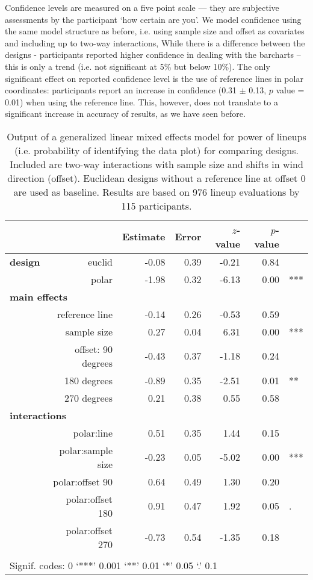  Confidence levels are measured on a five point scale --- they are subjective assessments by the participant `how certain are you'. We model confidence using the same model structure as before, i.e. using sample size and offset as covariates and including up to two-way interactions,
While there is a difference between the designs - participants reported higher confidence in dealing with the barcharts -- this is only  a trend (i.e. not significant at 5\% but below 10\%). The only significant effect on reported confidence level is the use of reference lines in polar coordinates: participants report an increase in confidence (0.31 $\pm$ 0.13, $p$ value = 0.01) when using the reference line. This, however, does not translate to a significant increase in accuracy of results, as we have seen before.

\begin{table}[ht]
\begin{center}
\resizebox{\linewidth}{!} {
\begin{tabular}{rrrrrrl}
  \hline
& & Estimate & Error & $z$-value & $p$-value &\\ 
  \hline
\bf design & euclid & -0.08 & 0.39 & -0.21 & 0.84 &\\ 
&polar & -1.98 & 0.32 & -6.13 & 0.00 & ***\\ [3pt]
\multicolumn{2}{l}{\bf main effects} &&&&&\\
& reference line  & -0.14 & 0.26 & -0.53 & 0.59 & \\ [1pt]
&  sample size & 0.27 & 0.04 & 6.31 & 0.00 & ***\\[1pt]
 &offset:  90 degrees& -0.43 & 0.37 & -1.18 & 0.24 &\\ 
  & 180 degrees& -0.89 & 0.35 & -2.51 & 0.01 & **\\ 
  & 270 degrees& 0.21 & 0.38 & 0.55 & 0.58 &\\ [3pt]
\multicolumn{2}{l}{\bf interactions} &&&&&\\
&  polar:line & 0.51 & 0.35 & 1.44 & 0.15 &\\ [1pt]
&    polar:sample size & -0.23 & 0.05 & -5.02 & 0.00 & ***\\[1pt]
&    polar:offset 90 & 0.64 & 0.49 & 1.30 & 0.20 \\ 
&  polar:offset 180 & 0.91 & 0.47 & 1.92 & 0.05 & .\\ 
&    polar:offset 270 & -0.73 & 0.54 & -1.35 & 0.18 &\\
   \hline
\\[-5pt]
   \multicolumn{5}{l}{Signif. codes:  0 `***' 0.001 `**' 0.01 `*' 0.05 `.' 0.1}
\end{tabular}
}
\end{center}
\caption{\label{tbl:correct} Output of a generalized linear mixed effects model for power of lineups (i.e. probability of identifying the data plot) for comparing designs. Included are two-way interactions with sample size and shifts in wind direction (offset). Euclidean designs without a reference line at offset 0 are used as baseline. 
 Results are based on  976 lineup evaluations by 115 participants. }
\end{table}


